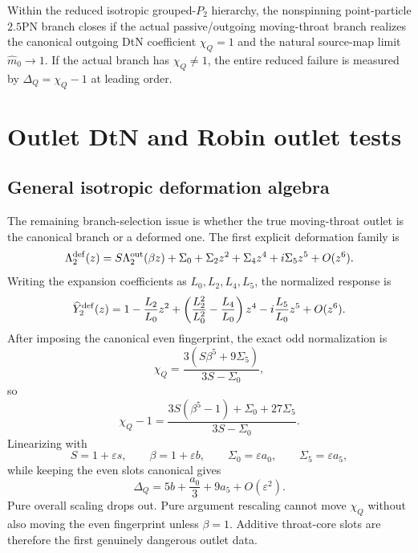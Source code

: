 \begin{theorem}
\label{thm:app-part04-conditional-25pn-closure}
Within the reduced isotropic grouped-\(P_2\) hierarchy, the nonspinning point-particle \(2.5\)PN branch closes if the actual passive/outgoing moving-throat branch realizes the canonical outgoing DtN coefficient \(\chi_Q=1\) and the natural source-map limit \(\widehat m_0\to1\).  If the actual branch has \(\chi_Q\neq1\), the entire reduced failure is measured by \(\Delta_Q=\chi_Q-1\) at leading order.
\end{theorem}

\section{Outlet DtN and Robin outlet tests}
\label{sec:app-part04_geometry_retarded_mouth:outlet-dtn-and-robin-outlet-tests}

\subsection{General isotropic deformation algebra}
\label{subsec:app-part04-general-dtn-algebra}

The remaining branch-selection issue is whether the true moving-throat outlet is the canonical branch or a deformed one.  The first explicit deformation family is
\begin{equation}
\label{eq:app-part04-general-dtn-deformation}
\Lambda_2^{\rm def}(z)
=
S\Lambda_2^{\rm out}(\beta z)
+\Sigma_0+\Sigma_2z^2+\Sigma_4z^4+i\Sigma_5z^5+O(z^6).
\end{equation}
Writing the expansion coefficients as \(L_0,L_2,L_4,L_5\), the normalized response is
\begin{equation}
\label{eq:app-part04-Ydef-expanded}
\widehat Y_2^{\rm def}(z)
=
1-\frac{L_2}{L_0}z^2+
\left(\frac{L_2^2}{L_0^2}-\frac{L_4}{L_0}\right)z^4
-i\frac{L_5}{L_0}z^5+O(z^6).
\end{equation}
After imposing the canonical even fingerprint, the exact odd normalization is
\begin{equation}
\label{eq:app-part04-chiQ-general}
\chi_Q
=
\frac{3(S\beta^5+9\Sigma_5)}{3S-\Sigma_0},
\end{equation}
so
\begin{equation}
\label{eq:app-part04-chiQ-minus-one-general}
\chi_Q-1
=
\frac{3S(\beta^5-1)+\Sigma_0+27\Sigma_5}{3S-\Sigma_0}.
\end{equation}
Linearizing with
\begin{equation}
S=1+\varepsilon s,
\qquad
\beta=1+\varepsilon b,
\qquad
\Sigma_0=\varepsilon a_0,
\qquad
\Sigma_5=\varepsilon a_5,
\end{equation}
while keeping the even slots canonical gives
\begin{equation}
\label{eq:app-part04-linear-DeltaQ-triple}
\Delta_Q=5b+\frac{a_0}{3}+9a_5+O(\varepsilon^2).
\end{equation}
Pure overall scaling drops out.  Pure argument rescaling cannot move \(\chi_Q\) without also moving the even fingerprint unless \(\beta=1\).  Additive throat-core slots are therefore the first genuinely dangerous outlet data.

